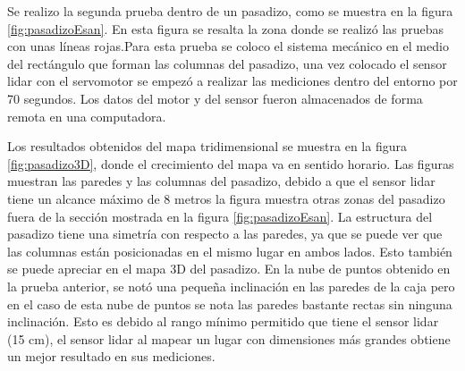 Se realizo la segunda prueba dentro de un pasadizo, como se muestra en la figura 
\ref{fig:pasadizoEsan}. En esta figura se resalta la zona donde se realizó las pruebas 
con unas líneas rojas.Para esta prueba se coloco el sistema mecánico en el medio del 
rectángulo que forman las columnas del pasadizo, una vez colocado el sensor lidar con 
el servomotor se empezó a realizar las mediciones dentro del entorno por 70 segundos. Los 
datos del motor y del sensor fueron almacenados de forma remota en una computadora. 

Los resultados obtenidos del mapa tridimensional se muestra en la figura \ref{fig:pasadizo3D}, 
donde el crecimiento del mapa va en sentido horario. Las figuras muestran las paredes y las 
columnas del pasadizo, debido a que el sensor lidar tiene un alcance máximo de 8 metros la 
figura muestra otras zonas del pasadizo fuera de la sección mostrada en la figura 
\ref{fig:pasadizoEsan}. La estructura del pasadizo tiene una simetría con respecto a las 
paredes, ya que se puede ver que las columnas están posicionadas en el mismo lugar en 
ambos lados. Esto también se puede apreciar en el mapa 3D del pasadizo. En la nube de puntos 
obtenido en la prueba anterior, se notó una pequeña inclinación en las paredes de la caja 
pero en el caso de esta nube de puntos se nota las paredes bastante rectas sin ninguna 
inclinación. Esto es debido al rango mínimo permitido que tiene el sensor lidar (15 cm), 
el sensor lidar al mapear un lugar con dimensiones más grandes obtiene un mejor resultado en 
sus mediciones.

